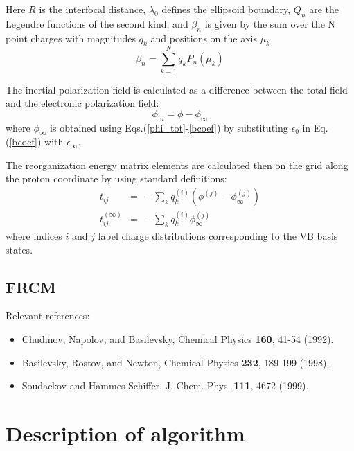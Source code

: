 \documentclass[oneside,11pt,openany]{book}
\begin{document}
Here $R$ is the interfocal distance, $\lambda_0$ defines the
ellipsoid boundary, $Q_n$ are the Legendre functions of the
second kind, and $\beta_n$ is given by the sum over the N
point charges with magnitudes $q_k$ and positions on the axis
$\mu_k$
\begin{equation}
\beta_n=\sum_{k=1}^N q_kP_n(\mu_k)
\label{beta}
\end{equation}
\par
The inertial polarization field is calculated as a difference
between the total field and the electronic polarization field:
\begin{equation}
\phi_{\mathrm in} = \phi - \phi_{\infty}
\label{phi_in}
\end{equation}
where $\phi_{\infty}$ is obtained using
Eqs.(\ref{phi_tot}-\ref{bcoef}) by substituting $\epsilon_0$
in Eq.(\ref{bcoef}) with $\epsilon_{\infty}$.
\par
The reorganization energy matrix elements are calculated
then on the grid along the proton coordinate by using standard definitions\cite{pcet-jcp1}:
\begin{eqnarray}
t_{ij} &=& -\sum_k q_k^{(i)}(\phi^{(j)}-\phi^{(j)}_{\infty}) \\
t_{ij}^{(\infty)} &=& -\sum_k q_k^{(i)}\phi^{(j)}_{\infty}
\label{tmat}
\end{eqnarray}
where indices $i$ and $j$ label charge distributions corresponding
to the VB basis states.


\subsection{FRCM}

Relevant references:
\begin{itemize}
\item{Chudinov, Napolov, and Basilevsky, Chemical Physics {\bf 160}, 41-54 (1992).}
\item{
Basilevsky, Rostov, and Newton, Chemical Physics {\bf 232}, 189-199 (1998).}
\item{
Soudackov and Hammes-Schiffer, J. Chem. Phys. {\bf 111}, 4672 (1999).}
\end{itemize}
\section*{Description of algorithm}
\end{document}
